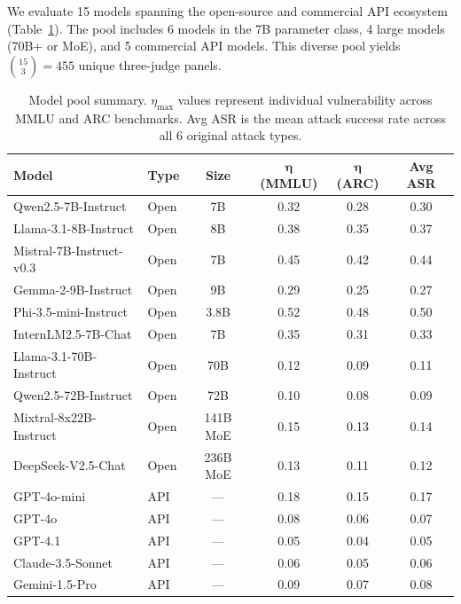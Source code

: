 \documentclass[11pt]{article}
\begin{document}
We evaluate 15 models spanning the open-source and commercial API ecosystem (Table~\ref{tab:models}). The pool includes 6 models in the 7B parameter class, 4 large models (70B+ or MoE), and 5 commercial API models. This diverse pool yields $\binom{15}{3} = 455$ unique three-judge panels.

\begin{table}[t]
\centering
\caption{Model pool summary. $\eta_{\max}$ values represent individual vulnerability across MMLU and ARC benchmarks. Avg ASR is the mean attack success rate across all 6 original attack types.}
\label{tab:models}
\small
\begin{tabular}{llcccc}
\toprule
\textbf{Model} & \textbf{Type} & \textbf{Size} & $\boldsymbol{\eta}$\textbf{(MMLU)} & $\boldsymbol{\eta}$\textbf{(ARC)} & \textbf{Avg ASR} \\
\midrule
Qwen2.5-7B-Instruct    & Open & 7B     & 0.32 & 0.28 & 0.30 \\
Llama-3.1-8B-Instruct  & Open & 8B     & 0.38 & 0.35 & 0.37 \\
Mistral-7B-Instruct-v0.3 & Open & 7B   & 0.45 & 0.42 & 0.44 \\
Gemma-2-9B-Instruct    & Open & 9B     & 0.29 & 0.25 & 0.27 \\
Phi-3.5-mini-Instruct  & Open & 3.8B   & 0.52 & 0.48 & 0.50 \\
InternLM2.5-7B-Chat    & Open & 7B     & 0.35 & 0.31 & 0.33 \\
\midrule
Llama-3.1-70B-Instruct & Open & 70B    & 0.12 & 0.09 & 0.11 \\
Qwen2.5-72B-Instruct   & Open & 72B    & 0.10 & 0.08 & 0.09 \\
Mixtral-8x22B-Instruct & Open & 141B MoE & 0.15 & 0.13 & 0.14 \\
DeepSeek-V2.5-Chat     & Open & 236B MoE & 0.13 & 0.11 & 0.12 \\
\midrule
GPT-4o-mini            & API  & ---     & 0.18 & 0.15 & 0.17 \\
GPT-4o                 & API  & ---     & 0.08 & 0.06 & 0.07 \\
GPT-4.1                & API  & ---     & 0.05 & 0.04 & 0.05 \\
Claude-3.5-Sonnet      & API  & ---     & 0.06 & 0.05 & 0.06 \\
Gemini-1.5-Pro         & API  & ---     & 0.09 & 0.07 & 0.08 \\
\bottomrule
\end{tabular}
\end{table}
\end{document}
